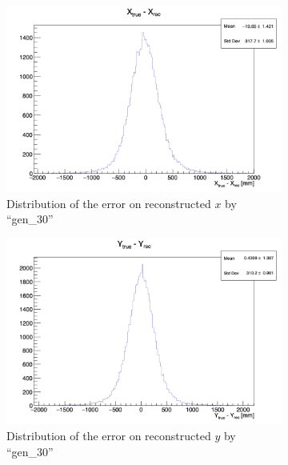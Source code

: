\begin{figure}[ht]
  \centering
  \begin{subfigure}[t]{0.32\linewidth}
    \centering
    \includegraphics[width=\linewidth]{images/jcnn/vic_cnn/cnn_delta_x.png}
    \caption{Distribution of the error on reconstructed $x$ by ``gen\_30''}
    \label{fig:jcnn:vic_cnn:cnn_delta_x}
  \end{subfigure}
  \begin{subfigure}[t]{0.32\linewidth}
    \centering
    \includegraphics[width=\linewidth]{images/jcnn/vic_cnn/cnn_delta_y.png}
    \caption{Distribution of the error on reconstructed $y$ by ``gen\_30''}
    \label{fig:jcnn:vic_cnn:cnn_delta_y}
  \end{subfigure}
  \begin{subfigure}[t]{0.32\linewidth}
    \centering

\end{subfigure}
\end{figure}
